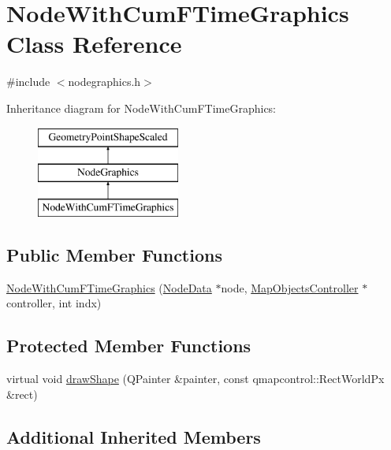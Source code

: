 \hypertarget{class_node_with_cum_f_time_graphics}{}\section{Node\+With\+Cum\+F\+Time\+Graphics Class Reference}
\label{class_node_with_cum_f_time_graphics}


{\ttfamily \#include $<$nodegraphics.\+h$>$}

Inheritance diagram for Node\+With\+Cum\+F\+Time\+Graphics\+:\begin{figure}[H]
\begin{center}
\leavevmode
\includegraphics[height=3.000000cm]{dc/dc4/class_node_with_cum_f_time_graphics}
\end{center}
\end{figure}
\subsection*{Public Member Functions}
\begin{DoxyCompactItemize}
\item 
\mbox{\hyperlink{class_node_with_cum_f_time_graphics_aab55c29ae78ca48ab28dbab9791ae83e}{Node\+With\+Cum\+F\+Time\+Graphics}} (\mbox{\hyperlink{class_node_data}{Node\+Data}} $\ast$node, \mbox{\hyperlink{class_map_objects_controller}{Map\+Objects\+Controller}} $\ast$controller, int indx)
\end{DoxyCompactItemize}
\subsection*{Protected Member Functions}
\begin{DoxyCompactItemize}
\item 
virtual void \mbox{\hyperlink{class_node_with_cum_f_time_graphics_a98ed08edc28f0f7a51604336dc4df650}{draw\+Shape}} (Q\+Painter \&painter, const qmapcontrol\+::\+Rect\+World\+Px \&rect)
\end{DoxyCompactItemize}
\subsection*{Additional Inherited Members}


